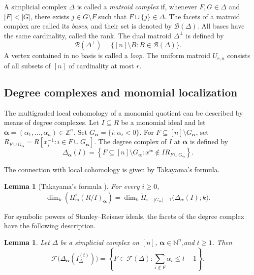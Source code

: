 \documentclass[12pt]{amsart}
\newtheorem{lemma}[proposition]{Lemma}
\begin{document}
A simplicial complex \(\Delta\) is called a \emph{matroid complex} if, whenever \(F,G\in\Delta\) and \(|F|<|G|\), there exists \(j\in G\setminus F\) such that \(F\cup\{j\}\in\Delta\). The facets of a matroid complex are called its \emph{bases}, and their set is denoted by \(\mathcal B(\Delta)\). All bases have the same cardinality, called the rank. The dual matroid \(\Delta^\perp\) is defined by
\[
\mathcal B(\Delta^\perp)
=
\{[n]\setminus B:B\in\mathcal B(\Delta)\}.
\]
A vertex contained in no basis is called a \emph{loop}. The uniform matroid \(U_{r,n}\) consists of all subsets of \([n]\) of cardinality at most \(r\).

\subsection{Degree complexes and monomial localization}

The multigraded local cohomology of a monomial quotient can be described by means of degree complexes. Let \(I\subseteq R\) be a monomial ideal and let \(\boldsymbol\alpha=(\alpha_1,\ldots,\alpha_n)\in\mathbb Z^n\). Set $G_{\boldsymbol\alpha} = \{i:\alpha_i<0\}.$ For \(F\subseteq[n]\setminus G_{\boldsymbol\alpha}\), set
\(R_{F\cup G_{\boldsymbol\alpha}} = R[x_i^{-1}:i\in F\cup G_{\boldsymbol\alpha}].\) The degree complex of \(I\) at \(\boldsymbol\alpha\) is defined by
\begin{equation}\label{degree-complex}
\Delta_{\boldsymbol\alpha}(I)
=
\left\{
F\subseteq[n]\setminus G_{\boldsymbol\alpha}:
x^{\boldsymbol\alpha}\notin
I R_{F\cup G_{\boldsymbol\alpha}}
\right\}.
\end{equation}

The connection with local cohomology is given by Takayama's formula.

\begin{lemma}[Takayama's formula {\cite[Theorem~2.2]{T}}]\label{TA}
For every \(i\ge0\),
\[
\dim_{k}(H^i_{\mathfrak m}(R/I)_{\boldsymbol\alpha})
=
\dim_{k}
\widetilde H_{i-|G_{\boldsymbol\alpha}|-1}
\bigl(\Delta_{\boldsymbol\alpha}(I);k\bigr).
\]
\end{lemma}

For symbolic powers of Stanley--Reisner ideals, the facets of the degree complex have the following description.

\begin{lemma}{\cite[Lemma~1.3]{MT}}\label{MTr} Let \(\Delta\) be a simplicial complex on \([n]\), \(\boldsymbol\alpha\in\mathbb N^n\),and \(t \ge 1\). Then
\[
\mathcal F\bigl(\Delta_{\boldsymbol\alpha}(I_\Delta^{(t)})\bigr)
=
\left\{
F\in\mathcal F(\Delta):
\sum_{i\notin F}\alpha_i\le t-1
\right\}.
\]
\end{lemma}
\end{document}
